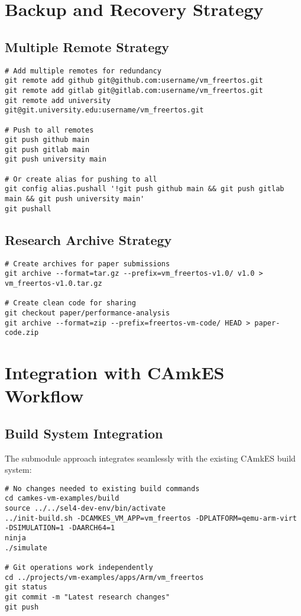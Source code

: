 \documentclass[11pt,a4paper]{article}
\begin{document}
\section{Backup and Recovery Strategy}

\subsection{Multiple Remote Strategy}

\begin{lstlisting}[caption=Multiple Backup Remotes]
# Add multiple remotes for redundancy
git remote add github git@github.com:username/vm_freertos.git
git remote add gitlab git@gitlab.com:username/vm_freertos.git
git remote add university git@git.university.edu:username/vm_freertos.git

# Push to all remotes
git push github main
git push gitlab main  
git push university main

# Or create alias for pushing to all
git config alias.pushall '!git push github main && git push gitlab main && git push university main'
git pushall
\end{lstlisting}

\subsection{Research Archive Strategy}

\begin{lstlisting}[caption=Creating Research Archives]
# Create archives for paper submissions
git archive --format=tar.gz --prefix=vm_freertos-v1.0/ v1.0 > vm_freertos-v1.0.tar.gz

# Create clean code for sharing
git checkout paper/performance-analysis
git archive --format=zip --prefix=freertos-vm-code/ HEAD > paper-code.zip
\end{lstlisting}

\section{Integration with CAmkES Workflow}

\subsection{Build System Integration}

The submodule approach integrates seamlessly with the existing CAmkES build system:

\begin{lstlisting}[caption=Build System Compatibility]
# No changes needed to existing build commands
cd camkes-vm-examples/build
source ../../sel4-dev-env/bin/activate
../init-build.sh -DCAMKES_VM_APP=vm_freertos -DPLATFORM=qemu-arm-virt -DSIMULATION=1 -DAARCH64=1
ninja
./simulate

# Git operations work independently
cd ../projects/vm-examples/apps/Arm/vm_freertos
git status
git commit -m "Latest research changes"
git push
\end{lstlisting}
\end{document}
